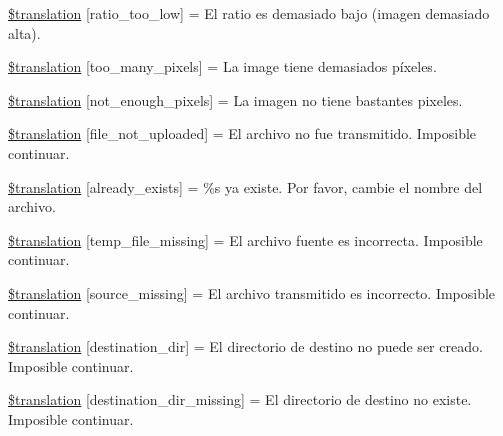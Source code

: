 \begin{DoxyCompactItemize}
\hyperlink{class_8upload_8es___e_s_8php_ac533b9a479f056b0b8623e4268f068c2}{\$translation} \mbox{[}\textquotesingle{}ratio\+\_\+too\+\_\+low\textquotesingle{}\mbox{]} = \textquotesingle{}El ratio es demasiado bajo (imagen demasiado alta).\textquotesingle{}
\item 
\hyperlink{class_8upload_8es___e_s_8php_aa4051ef64e94a3f8295c63cf85544016}{\$translation} \mbox{[}\textquotesingle{}too\+\_\+many\+\_\+pixels\textquotesingle{}\mbox{]} = \textquotesingle{}La image tiene demasiados píxeles.\textquotesingle{}
\item 
\hyperlink{class_8upload_8es___e_s_8php_a1fe342c27ce61f4ff4e0120ba647033e}{\$translation} \mbox{[}\textquotesingle{}not\+\_\+enough\+\_\+pixels\textquotesingle{}\mbox{]} = \textquotesingle{}La imagen no tiene bastantes pixeles.\textquotesingle{}
\item 
\hyperlink{class_8upload_8es___e_s_8php_a4ce76e7be0b3a03c2b47f6d70c21832e}{\$translation} \mbox{[}\textquotesingle{}file\+\_\+not\+\_\+uploaded\textquotesingle{}\mbox{]} = \textquotesingle{}El archivo no fue transmitido. Imposible continuar.\textquotesingle{}
\item 
\hyperlink{class_8upload_8es___e_s_8php_afd84e910217f04139f567c41e292afa5}{\$translation} \mbox{[}\textquotesingle{}already\+\_\+exists\textquotesingle{}\mbox{]} = \textquotesingle{}\%s ya existe. Por favor, cambie el nombre del archivo.\textquotesingle{}
\item 
\hyperlink{class_8upload_8es___e_s_8php_ab0fa87a88aba2624004581eed0633325}{\$translation} \mbox{[}\textquotesingle{}temp\+\_\+file\+\_\+missing\textquotesingle{}\mbox{]} = \textquotesingle{}El archivo fuente es incorrecta. Imposible continuar.\textquotesingle{}
\item 
\hyperlink{class_8upload_8es___e_s_8php_aceaaf7355acaaf10f0ae60378d03c468}{\$translation} \mbox{[}\textquotesingle{}source\+\_\+missing\textquotesingle{}\mbox{]} = \textquotesingle{}El archivo transmitido es incorrecto. Imposible continuar.\textquotesingle{}
\item 
\hyperlink{class_8upload_8es___e_s_8php_aff2427c72a2598aefa6d58df1dd18b08}{\$translation} \mbox{[}\textquotesingle{}destination\+\_\+dir\textquotesingle{}\mbox{]} = \textquotesingle{}El directorio de destino no puede ser creado. Imposible continuar.\textquotesingle{}
\item 
\hyperlink{class_8upload_8es___e_s_8php_a9ef28d3cf09942c6c0a1e77fa09185e8}{\$translation} \mbox{[}\textquotesingle{}destination\+\_\+dir\+\_\+missing\textquotesingle{}\mbox{]} = \textquotesingle{}El directorio de destino no existe. Imposible continuar.\textquotesingle{}

\end{DoxyCompactItemize}
